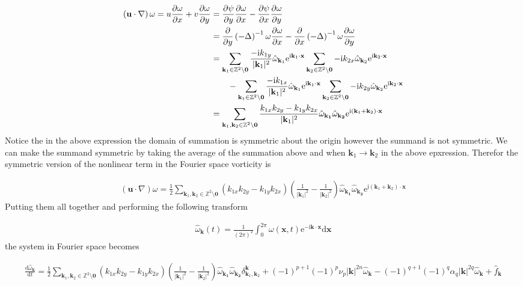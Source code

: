 \documentclass[9pt]{article}
\newcommand{\der}[2]{\frac{\mathrm{d}#1}{\mathrm{d}#2}}          	 %
\newcommand{\pder}[2]{\frac{\partial #1}{\partial #2}}               %
\newcommand{\ii}{\mathrm{i}}      								  %
\newcommand{\e}{\mathrm{e}}      								  %
\newcommand{\bfu}{\mathbf{u}}											%
\newcommand{\omegahat}[1]{\hat{\omega}_{ \mathbf{#1} } }								%
\newcommand{\bfx}{\mathbf{x}}								%
\newcommand{\bfk}{\mathbf{k}}								%
\newcommand{\bfkn}[1]{\mathbf{k}_{#1}}								%
\begin{document}
\begin{align}
\left(\bfu \cdot \nabla\right) \omega	= u\pder{\omega}{x} + v\pder{\omega}{y} &= \pder{\psi}{y}\pder{\omega}{x} - \pder{\psi}{x}\pder{\omega}{y} \notag \\
&= \pder{}{y}\left(-\Delta\right)^{-1}\omega\pder{\omega}{x} - \pder{}{x}\left(-\Delta\right)^{-1}\omega\pder{\omega}{y} \notag \\
&= \sum_{\mathbf{k}_1\in \mathbb{Z}^2\setminus \mathbf{0}} \frac{-\ii k_{1y}}{|\bfkn{1}|^2}\hat{\omega}_{\bfkn{1}} \e^{\ii \bfkn{1}\cdot \mathbf{x}} \sum_{\mathbf{k}_2\in \mathbb{Z}^2\setminus \mathbf{0}} -\ii k_{2x}\hat{\omega}_{\bfkn{2}} \e^{\ii \bfkn{2}\cdot \mathbf{x}} \notag\\
&\qquad - \sum_{\mathbf{k}_1\in \mathbb{Z}^2\setminus \mathbf{0}} \frac{-\ii k_{1x}}{|\bfkn{1}|^2}\hat{\omega}_{\bfkn{1}} \e^{\ii \bfkn{1}\cdot \mathbf{x}} \sum_{\mathbf{k}_2\in \mathbb{Z}^2\setminus \mathbf{0}} -\ii k_{2y}\hat{\omega}_{\bfkn{2}} \e^{\ii \bfkn{2}\cdot \mathbf{x}} \notag \\
&= \sum_{\mathbf{k}_1, \mathbf{k}_2\in \mathbb{Z}^2\setminus \mathbf{0}}\frac{k_{1x}k_{2y} - k_{1y}k_{2x}}{|\bfkn{1}|^2} \omegahat{\bfkn{1}}\omegahat{\bfkn{2}} \e^{\ii (\bfkn{1} + \bfkn{2}) \cdot \bfx}
\end{align}
Notice the in the above expression the domain of summation is symmetric about the origin however the summand is not symmetric. We can make the summand symmetric by taking the average of the summation above and when $\bfkn{1} \rightarrow \bfkn{2}$ in the above epxression. Therefor the symmetric version of the nonlinear term in the Fourier space vorticity is

\begin{align}
	\left(\bfu \cdot \nabla\right) \omega = \frac{1}{2} \sum_{\mathbf{k}_1, \mathbf{k}_2\in \mathbb{Z}^2\setminus \mathbf{0}}\left(k_{1x}k_{2y} - k_{1y}k_{2x}\right) \left(\frac{1}{|\bfkn{1}|^2} - \frac{1}{|\bfkn{2}|^2}\right) \omegahat{\bfkn{1}}\omegahat{\bfkn{2}} \e^{\ii (\bfkn{1} + \bfkn{2}) \cdot \bfx}
\end{align}
Putting them all together and performing the following transform

\begin{align}
	\omegahat{\bfk} (t)= \frac{1}{(2\pi)^2}\int_0^{2\pi}\omega(\bfx, t)\e^{-\ii \bfk \cdot \bfx}\mathrm{d}\mathbf{x}
\end{align}
the system in Fourier space becomes

\begin{align}
	\der{\omegahat{k}}{t} = \frac{1}{2}	\sum_{\mathbf{k}_1, \mathbf{k}_2\in \mathbb{Z}^2\setminus \mathbf{0}}\left(k_{1x}k_{2y} - k_{1y}k_{2x}\right) \left(\frac{1}{|\bfkn{1}|^2} - \frac{1}{|\bfkn{2}|^2}\right) \omegahat{\bfkn{1}}\omegahat{\bfkn{2}} \delta_{\bfkn{1}, \bfkn{2}}^{\bfk} +(-1)^{p + 1} (-1)^p\nu_p |\bfk|^{2n}\omegahat{k} -(-1)^{q + 1}(-1)^{q} \alpha_q|\bfk|^{2q}\omegahat{k} + \hat{f}_{\bfk}
	\label{eq:vort_eqn_fourier_space}
\end{align}
\end{document}
